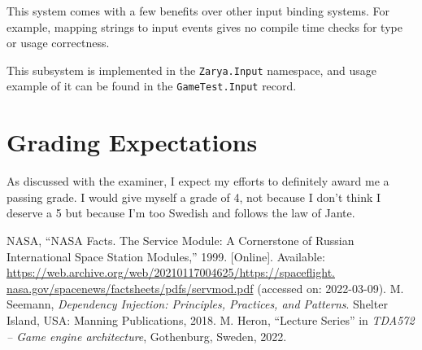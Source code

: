 \documentclass{article}
\begin{document}
This system comes with a few benefits over other input binding systems.
For example, mapping strings to input events gives no compile time checks for type or usage correctness.

This subsystem is implemented in the \texttt{Zarya.Input} namespace, and usage example of it can be found in the \texttt{GameTest.Input} record.

\section*{Grading Expectations}

As discussed with the examiner, I expect my efforts to definitely award me a passing grade.
I would give myself a grade of 4, not because I don't think I deserve a 5 but because I'm too Swedish and follows the law of Jante.

\newpage

\begin{thebibliography}{2}
		NASA, ``NASA Facts. The Service Module: A Cornerstone of Russian International Space Station Modules,'' 1999.
		[Online]. Available: \url{https://web.archive.org/web/20210117004625/https://spaceflight.  nasa.gov/spacenews/factsheets/pdfs/servmod.pdf} (accessed on: 2022-03-09).
		M. Seemann, \emph{Dependency Injection: Principles, Practices, and Patterns}.
		Shelter Island, USA: Manning Publications, 2018.
		M. Heron, ``Lecture Series'' in \emph{TDA572 -- Game engine architecture}, Gothenburg, Sweden, 2022.
\end{thebibliography}
\end{document}
